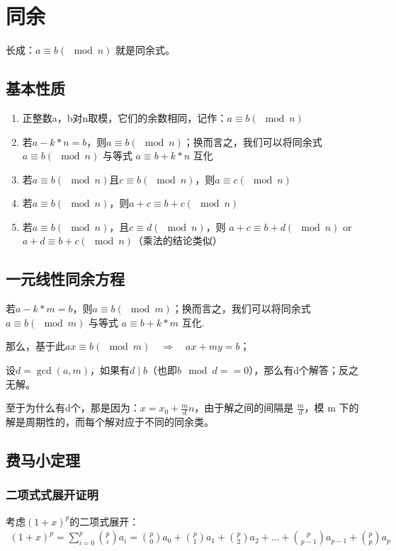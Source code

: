 \documentclass[12pt]{article}
\begin{document}
\section{同余}
长成：$a\equiv b(\mod n)$ 就是同余式。

\subsection{基本性质}

\begin{enumerate}
    \item 正整数a，b对n取模，它们的余数相同，记作：$a\equiv b(\mod n)$
    \item 若$a-k*n=b$，则$a\equiv b(\mod n)$；换而言之，我们可以将同余式 $a\equiv b(\mod n)$ 与等式 $a\equiv b+k*n$ 互化
    \item 若$a\equiv b(\mod n)$且$c\equiv b(\mod n)$，则$a\equiv c(\mod n)$
    \item 若$a\equiv b(\mod n)$，则$a+c\equiv b+c(\mod n)$ 
    \item 若$a\equiv b(\mod n)$，且$c\equiv d(\mod n)$，则 $a+c\equiv b+d(\mod n)$ or $a+d\equiv b+c(\mod n)$（乘法的结论类似）
\end{enumerate}


\subsection{一元线性同余方程}

若$a-k*m=b$，则$a\equiv b(\mod m)$；换而言之，我们可以将同余式 $a\equiv b(\mod m)$ 与等式 $a\equiv b+k*m$ 互化.

那么，基于此$ax\equiv b(\mod m) \quad \Rightarrow \quad ax+my=b$；

设$d=\gcd(a,m)$，如果有$d \mid b$（也即$b\mod d == 0$），那么有d个解答；反之无解。

至于为什么有d个，那是因为：$x=x_{0}+\frac{m}{d}n$，由于解之间的间隔是 $\frac{m}{d}$，模 
m 下的解是周期性的，而每个解对应于不同的同余类。


\subsection{费马小定理}

\subsubsection{二项式式展开证明}
考虑$(1+x)^{p}$的二项式展开：
\begin{align*}
    (1+x)^{p} = \sum_{i=0}^{p}\binom{p}{i}a_{i} = \binom{p}{0}a_{0} + \binom{p}{1}a_{1} + \binom{p}{2}a_{2} + \dots + \binom{p}{p-1}a_{p-1} + \binom{p}{p}a_{p}
\end{align*}
\end{document}
